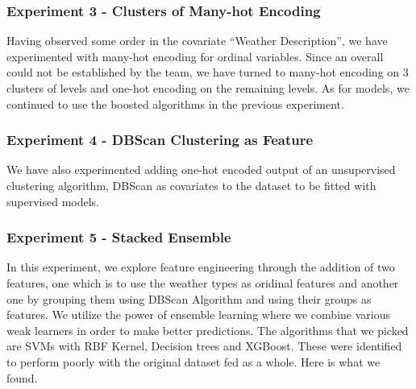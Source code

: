 \documentclass[10pt]{article}
\begin{document}
\subsubsection{Experiment 3 - Clusters of Many-hot Encoding}
Having observed some order in the covariate ``Weather Description'', we
have experimented with many-hot encoding for ordinal variables. Since an
overall could not be established by the team, we have turned to many-hot
encoding on 3 clusters of levels and one-hot encoding on the remaining
levels. As for models, we continued to use the boosted algorithms in the
previous experiment.\par
\subsubsection{Experiment 4 - DBScan Clustering as Feature}
We have also experimented adding one-hot encoded output of an unsupervised
clustering algorithm, DBScan as covariates to the dataset to be fitted with
supervised models.\par
\subsubsection{Experiment 5 - Stacked Ensemble}
In this experiment, we explore feature engineering through the addition of
two features, one which is to use the weather types as oridinal features
and another one by grouping them using DBScan Algorithm and using their
groups as features. We utilize the power of ensemble learning where we
combine various weak learners in order to make better predictions. The
algorithms that we picked are SVMs with RBF Kernel, Decision trees and
XGBoost.
These were identified to perform poorly with the original dataset fed as a
whole. Here is what we found.
\par
\end{document}
